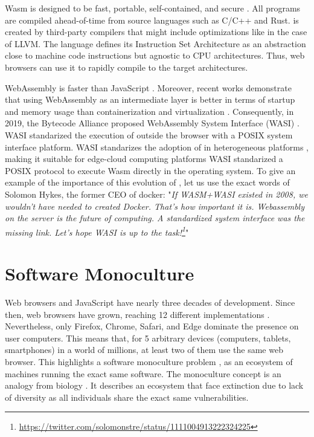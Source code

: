 Wasm is designed to be fast, portable, self-contained, and secure \cite{Haas_2017}.
All \wasm programs are compiled ahead-of-time from source languages such as C/C++ and Rust.
\wasm is created by third-party compilers that might include optimizations like in the case of LLVM.  
The \wasm language defines its Instruction Set Architecture \cite{wasm_spec} as an abstraction close to machine code instructions but agnostic to CPU architectures. Thus,  web browsers can use it to rapidly compile to the target architectures. %

WebAssembly is faster than JavaScript \cite{Haas_2017}. Moreover, recent works demonstrate that using WebAssembly as an intermediate layer is better in terms of startup and memory usage than containerization and virtualization \cite{pMendkiServerless, 1244493Jacobsson}. 
Consequently, in 2019, the Bytecode Alliance \cite{bytecodealliance} proposed WebAssembly System Interface (WASI) \cite{WASI}. 
WASI standarized the execution of \wasm outside the browser with a POSIX system interface platform.
WASI standarizes the adoption of \wasm in heterogeneous platforms \cite{bryant2020webassembly}, making it suitable for edge-cloud computing platforms \cite{9640153, wen2020wasmachine}
WASI standarized a POSIX protocol to execute Wasm directly in the operating system. 
To give an example of the importance of this evolution of \wasm, let us use the exact words of Solomon Hykes, the former CEO of docker: 
"\textit{If WASM+WASI existed in 2008, we wouldn't have needed to created Docker. That's how important it is. Webassembly on the server is the future of computing. A standardized system interface was the missing link. Let's hope WASI is up to the task!\footnote{\url{https://twitter.com/solomonstre/status/1111004913222324225}}}"

\section{Software Monoculture}
Web browsers and JavaScript have nearly three decades of development.
Since then, web browsers have grown, reaching 12 different implementations \cite{grosskurth2005reference, GARCES2021111004}. 
Nevertheless, only Firefox, Chrome, Safari, and Edge dominate the presence on user computers.
This means that, for 5 arbitrary devices (computers, tablets, smartphones) in a world of millions, at least two of them use the same web browser.
This highlights a software monoculture problem \cite{goth2003addressing}, as an ecosystem of machines running the exact same software. 
The monoculture concept is an analogy from biology \cite{lala2009monoculture}. It describes an ecosystem that face extinction due to lack of diversity as all individuals share the exact same vulnerabilities.

